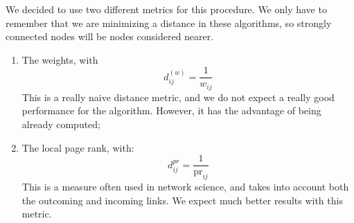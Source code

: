We decided to use two different metrics for this procedure. We only have to remember that 
we are minimizing a distance in these algorithms, so strongly connected nodes will be 
nodes considered nearer. 
\begin{enumerate}
    \item The weights, with 
        $$d^(w)_{ij}=\frac{1}{w_{ij}}$$
        This is a really naive distance metric, and we do not expect a really good performance
        for the algorithm. However, it has the advantage of being already computed;
    \item The local page rank, with:
        $$d^{pr}_{ij}=\frac{1}{\mbox{pr}_{ij}}$$
        This is a measure often used in network science, and takes into account both the outcoming
        and incoming links. We expect much better results with this metric.
\end{enumerate}

